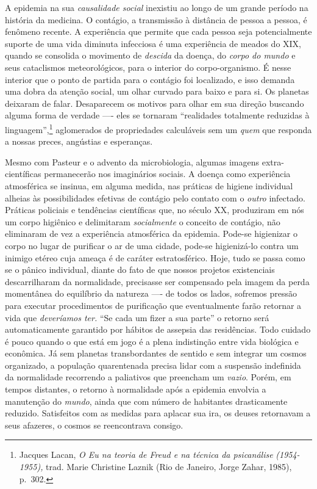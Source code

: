 A epidemia na sua \textit{causalidade social} inexistiu ao longo de um
grande período na história da medicina. O contágio, a transmissão à
distância de pessoa a pessoa, é fenômeno recente. A experiência que
permite que cada pessoa seja potencialmente suporte de uma vida diminuta
infecciosa é uma experiência de meados do XIX, quando se consolida o
movimento de \textit{descida} da doença, do \textit{corpo do mundo} e seus
cataclismos meteorológicos, para o interior do corpo-organismo. É nesse
interior que o ponto de partida para o contágio foi localizado, e isso
demanda uma dobra da atenção social, um olhar curvado para baixo e para
si. Os planetas deixaram de falar. Desaparecem os motivos para olhar em
sua direção buscando alguma forma de verdade ---- eles se tornaram
``realidades totalmente reduzidas à linguagem'',\footnote{Jacques Lacan,
  \textit{O Eu na teoria de Freud e na técnica da psicanálise}
  \textit{(1954-1955),} trad. Marie Christine Laznik (Rio de Janeiro,
  Jorge Zahar, 1985), p.~302.} aglomerados de propriedades calculáveis
sem um \textit{quem} que responda a nossas preces, angústias e esperanças.

Mesmo com Pasteur e o advento da microbiologia, algumas imagens
extra-científicas permanecerão nos imaginários sociais. A doença como
experiência atmosférica se insinua, em alguma medida, nas práticas de
higiene individual alheias às possibilidades efetivas de contágio pelo
contato com o \textit{outro} infectado. Práticas policiais e tendências
científicas que, no século XX, produziram em nós um corpo higiênico e
delimitaram \textit{socialmente} o conceito de contágio, não eliminaram de
vez a experiência atmosférica da epidemia. Pode-se higienizar o corpo no
lugar de purificar o ar de uma cidade, pode-se higienizá-lo contra um
inimigo etéreo cuja ameaça é de caráter estratosférico. Hoje, tudo se
passa como se o pânico individual, diante do fato de que nossos projetos
existenciais descarrilharam da normalidade, precisasse ser compensado
pela imagem da perda momentânea do equilíbrio da natureza ---- de todos
os lados, sofremos pressão para executar procedimentos de purificação
que eventualmente farão retornar a vida que \textit{deveríamos ter.} ``Se
cada um fizer a sua parte'' o retorno será automaticamente garantido por
hábitos de assepsia das residências. Todo cuidado é pouco quando o que
está em jogo é a plena indistinção entre vida biológica e econômica. Já
sem planetas transbordantes de sentido e sem integrar um cosmos
organizado, a população quarentenada precisa lidar com a suspensão
indefinida da normalidade recorrendo a paliativos que preencham um
\textit{vazio}. Porém, em tempos distantes, o retorno à normalidade após a
epidemia envolvia a manutenção do \textit{mundo}, ainda que com número de
habitantes drasticamente reduzido. Satisfeitos com as medidas para
aplacar sua ira, os deuses retornavam a seus afazeres, o cosmos se
reencontrava consigo.

